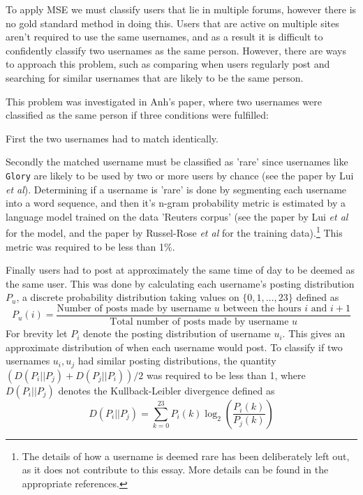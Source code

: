 \documentclass[10pt,a4paper,notitlepage]{article}
\begin{document}
To apply MSE we must classify users that lie in multiple forums, however there is no gold standard method in doing this. Users that are active on multiple sites aren't required to use the same usernames, and as a result it is difficult to confidently classify two usernames as the same person. However, there are ways to approach this problem, such as comparing when users regularly post and searching for similar usernames that are likely to be the same person.

This problem was investigated in Anh's paper, where two usernames were classified as the same person if three conditions were fulfilled:

First the two usernames had to match identically. 

Secondly the matched username must be classified as 'rare' since usernames like \texttt{Glory} are likely to be used by two or more users by chance (see the paper \cite{27} by Lui \textit{et al}). Determining if a username is 'rare' is done by segmenting each username into a word sequence, and then it's n-gram probability metric is estimated by a language model trained on the data 'Reuters corpus' (see the paper \cite{gram} by Lui \textit{et al} for the model, and the paper \cite{corpus} by Russel-Rose \textit{et al} for the training data).\footnote{The details of how a username is deemed rare has been deliberately left out, as it does not contribute to this essay. More details can be found in the appropriate references.} This metric was required to be less than 1\%.

Finally users had to post at approximately the same time of day to be deemed as the same user. This was done by calculating each username's posting distribution $P_{u}$, a discrete probability distribution taking values on $\{0,1,\hdots, 23\}$ defined as
\begin{equation}
P_{u}(i)=\frac{\text{Number of posts made by username } u \text{ between the hours }i \text{ and } i+1}{\text{Total number of posts made by username }u}
\end{equation}
For brevity let $P_{i}$ denote the posting distribution of username $u_{i}$. This gives an approximate distribution of when each username would post. To classify if two usernames $u_{i},u_{j}$ had similar posting distributions, the quantity $(D(P_{i}||P_{j})+D(P_{j}||P_{i}))/2$ was required to be less than 1, where $D(P_{i}||P_{j})$ denotes the Kullback-Leibler divergence defined as
\begin{equation}
D(P_{i}||P_{j})=\sum_{k=0}^{23}P_{i}(k)\log_{2}\left(\frac{P_{i}(k)}{P_{j}(k)}\right)
\end{equation}
\end{document}
